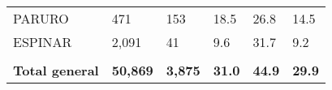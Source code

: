 \begin{tabular}{llllll}
	\cellcolor[HTML]{FFFF99}PARURO                                 & 471                                                                   & 153                                                              & 18.5                                                                             & 26.8                                                                        & 14.5                                                                                \\
	\cellcolor[HTML]{FFFF99}ESPINAR                                & 2,091                                                                 & 41                                                               & 9.6                                                                              & 31.7                                                                        & 9.2                                                                                 \\
	&                                                                       &                                                                  &                                                                                  &                                                                             &                                                                                     \\
	\rowcolor[HTML]{DDEBF7} 
	\textbf{Total   general}                                       & \textbf{50,869}                                                       & \textbf{3,875}                                                   & \textbf{31.0}                                                                    & \textbf{44.9}                                                               & \textbf{29.9}                                                                      
\end{tabular}